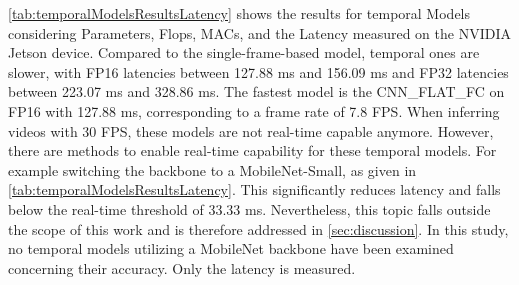 \clearpage

\noindent\autoref{tab:temporalModelsResultsLatency} shows the results for temporal Models considering Parameters, Flops, MACs, and the Latency measured on the NVIDIA Jetson device.
Compared to the single-frame-based model, temporal ones are slower, with FP16 latencies between 127.88 ms and 156.09 ms and FP32 latencies between 223.07 ms and 328.86 ms.
The fastest model is the CNN\_FLAT\_FC on FP16 with 127.88 ms, corresponding to a frame rate of 7.8 \ac{FPS}.
When inferring videos with 30 \ac{FPS}, these models are not real-time capable anymore.
However, there are methods to enable real-time capability for these temporal models.
For example switching the backbone to a MobileNet-Small, as given in \autoref{tab:temporalModelsResultsLatency}.
This significantly reduces latency and falls below the real-time threshold of 33.33 ms.
Nevertheless, this topic falls outside the scope of this work and is therefore addressed in \autoref{sec:discussion}.
In this study, no temporal models utilizing a MobileNet backbone have been examined concerning their accuracy.
Only the latency is measured.